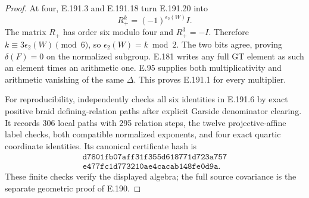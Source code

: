 \begin{proof}
At four, E.191.3 and E.191.18 turn
E.191.20 into
\[
                      R_+^k=(-1)^{\epsilon_2(W)}I .
\tag{E.191.21}
\]
The matrix \(R_+\) has order six modulo
four and \(R_+^3=-I\).  Therefore
\(k\equiv3\epsilon_2(W)\pmod6\), so
\(\epsilon_2(W)=k\bmod2\).
The two bits agree, proving \(\delta(F)=0\)
on the normalized subgroup.
E.181 writes any full GT element as
such an element times an arithmetic one.
E.95 supplies both multiplicativity and
arithmetic vanishing of the same \(\Delta\).
This proves E.191.1 for every multiplier.

For reproducibility,
 independently
checks all six identities in E.191.6 by exact
positive braid defining-relation paths after
explicit Garside denominator clearing.  It records
306 local paths with 295 relation steps, the twelve
projective-affine label checks, both compatible
normalized exponents, and four exact quartic
coordinate identities.  Its canonical certificate
hash is
\[
 \begin{gathered}
 \texttt{d7801fb07aff31f355d618771d723a757}\\
 \texttt{e477fc1d773210ae4cacab148fe0d9a}.
 \end{gathered}
\]
These finite checks verify the displayed algebra;
the full source covariance is the separate
geometric proof of E.190.
\end{proof}
